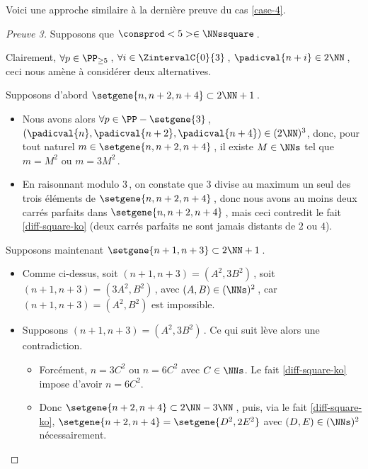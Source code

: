 

Voici une approche similaire à la dernière preuve du cas \ref{case-4}.
	
	
\begin{proof}[Preuve 3]
    Supposons que $\consprod<5> \in \NNssquare$\,.
    
    \smallskip
    
	Clairement, $\forall p \in \PP_{\geq 5}$\,, 
   	$\forall i \in \ZintervalC{0}{3}$\,, 
    $\padicval{n + i} \in 2 \NN$\,,
    ceci nous amène à considérer deux alternatives.
    
    \medskip
    
    Supposons d'abord $\setgene{n, n + 2, n + 4} \subset 2 \NN + 1$\,.
	\begin{itemize}
		\item
		Nous avons alors
		$\forall p \in \PP - \setgene{3}$\,, 
   		$(\padicval{n}, \padicval{n+2}, \padicval{n+4}) \in ( 2 \NN )^3$,
		donc, pour tout naturel $m \in \setgene{n, n + 2, n + 4}$\,, 
		il existe $M \in \NNs$ tel que 
		$m = M^2$ ou $m = 3 M^2$\,.
	
		\item En raisonnant modulo $3$\,, on constate que $3$ divise au maximum un seul des trois éléments de $\setgene{n, n + 2, n + 4}$\,, donc nous avons au moins deux carrés parfaits dans $\setgene{n, n + 2, n + 4}$\,, mais ceci contredit le fait \ref{diff-square-ko} (deux carrés parfaits ne sont jamais distants de $2$ ou $4$).
    \end{itemize}
    
    \medskip
    
    Supposons maintenant $\setgene{n + 1, n + 3} \subset 2 \NN + 1$\,.
	\begin{itemize}
		\item
		Comme ci-dessus,
		soit $(n + 1, n + 3) = (A^2, 3 B^2)$\,,
		soit $(n + 1, n + 3) = (3 A^2, B^2)$\,,
		avec $(A, B) \in ( \NNs )^2$\,,
		car $(n + 1, n + 3) = (A^2, B^2)$ est impossible.
	
		\item Supposons $(n + 1, n + 3) = (A^2, 3 B^2)$\,. Ce qui suit lève alors une contradiction.
		\begin{itemize}
			\item Forcément, $n = 3 C^2$ ou $n = 6 C^2$ avec $C \in \NNs$.
			Le fait \ref{diff-square-ko} impose d'avoir $n = 6 C^2$.

			\item Donc 
			$\setgene{n + 2, n + 4} \subset 2 \NN - 3 \NN$\,, 
			puis, via le fait \ref{diff-square-ko},
			$\setgene{n + 2, n + 4} = \setgene{D^2, 2 E^2}$ 
			avec $(D, E) \in ( \NNs )^2$ nécessairement.


\end{itemize}
\end{itemize}
\end{proof}
